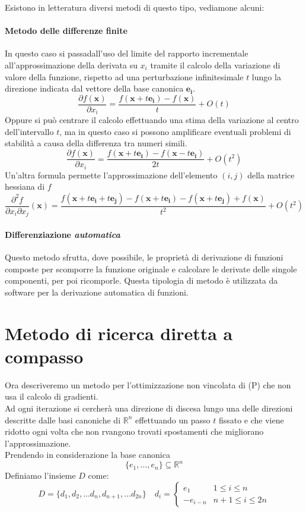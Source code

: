Esistono in letteratura diversi metodi di questo tipo, vediamone alcuni:
 \paragraph{Metodo delle differenze finite}
In questo caso si passadall'uso del limite del rapporto incrementale all'approssimazione
della derivata su $x_i$ tramite il calcolo della variazione di valore
della funzione, rispetto ad una perturbazione infinitesimale $t$ lungo
la direzione indicata dal vettore della base canonica $\mathbf{e_i}$.
 $$ \frac{\partial f(\mathbf{x})}{\partial x_i} = 
  \frac{f(\mathbf{x}+ t \mathbf{e_i})- f(\mathbf{x})}{t} + O(t) $$
Oppure si può centrare il calcolo effettuando una stima della
variazione al centro dell'intervallo $t$, ma in questo caso si possono
amplificare eventuali problemi di stabilità a causa della differenza
tra numeri simili.
 $$ \frac{\partial f(\mathbf{x})}{\partial x_i} = 
  \frac{f(\mathbf{x}+ t \mathbf{e_i})- f(\mathbf{x} -
t\mathbf{e_i})}{2t} + O(t^2) $$ Un'altra formula permette
l'approssimazione dell'elemento $(i,j)$ della matrice hessiana di $f$
 $$ \frac{\partial^2 f}{\partial x_i\partial x_j}(\mathbf{x}) = 
  \frac{f(\mathbf{x}+ t \mathbf{e_i} + t\mathbf{e_j})- f(\mathbf{x}+
    t\mathbf{e_i}) - f(\mathbf{x} + t\mathbf{e_j}) + f(\mathbf{x})}{t^2} +
O(t^2) $$

\paragraph{Differenziazione \emph{automatica}}
Questo metodo sfrutta, dove possibile, le propriet\`a di derivazione di
funzioni composte per scomporre la funzione originale e calcolare le
derivate delle singole componenti, per poi ricomporle. Questa
tipologia di metodo \`e utilizzata da software per la derivazione
automatica di funzioni.
 
\section{Metodo di ricerca diretta a compasso}

Ora descriveremo un metodo per l'ottimizzazione non vincolata di (P)
che non usa il calcolo di gradienti.\\ Ad ogni iterazione si cercher\`a
una direzione di discesa lungo una delle direzioni descritte dalle
basi canoniche di $\mathbb{R}^n$ effettuando un passo $t$ fissato e
che viene ridotto ogni volta che non rvangono trovati spostamenti che
migliorano l'approssimazione.  \\ Prendendo in considerazione la base
canonica
 $$ \{e_1, \ldots, e_n  \} \subseteq \mathbb{R}^{n} $$
Definiamo l'insieme $D$ come:
$$D = \{ d_1, d_2, \ldots d_n, d_{n+1}, \ldots d_{2n}\} \quad
 d_i = \left\{
\begin{array}{ll} e_1 & 1 \leq i \leq n \\ -e_{i-n} & n+1 \leq i \leq
2n
\end{array} \right.
$$

